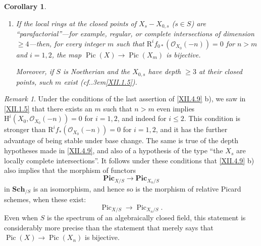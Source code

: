 \documentclass[11pt,a4paper,oneside]{book}
\providecommand{\sisi}[2]{#2}
\providecommand{\pageoriginale}{%
  \refstepcounter{pageoriginal}%
  \marginpar{\raggedright\footnotesize\bfseries\thepageoriginal}%
  \xspace}
\providecommand{\og}{``}
\providecommand{\fg}{''\xspace}
\providecommand{\cf}{cf.\kern.3em}
\providecommand{\Oo}{\mathcal O}
\providecommand{\catSch}{\mathbf{Sch}}
\providecommand{\SheafPic}{\mathbf{Pic}}
\providecommand{\Pic}{\operatorname{Pic}}
\renewcommand{\H}{\mathrm H}
\providecommand{\R}{\mathrm R}
\newenvironment{enumeratea}
  {\begin{enumerate}[label=\alph*)]}
  {\end{enumerate}}
\theoremstyle{plain}
\newtheorem{corollaire}[subsection]{Corollary}
\theoremstyle{definition}
\theoremstyle{remark}
\newtheorem{remarque}[subsection]{Remark}
\renewcommand{\Ref}[1]{\textup{\ref{#1}}}
\begin{document}
\begin{corollaire}
\begin{enumeratea}
\item
If the local rings at the closed points of $X_s-X_{0,s}$ ($s\in S$) are \og parafactorial\fg---for example, regular, or complete intersections of dimension $\geq 4$---then, for every integer $m$ such that $\R^if_{0\ast}(\Oo_{X_0}(-n))=0$ for $n>m$ and $i=1,2$, the map $\Pic(X)\to \Pic(X_m)$ is bijective.

Moreover, if $S$ is Noetherian and the $X_{0,s}$ have depth $\geq 3$ at their closed points, such $m$ exist (\cf \Ref{XII.1.5}).
\end{enumeratea}
\end{corollaire}

\begin{remarque} \label{XII.4.10}
Under\pageoriginale the conditions of the last assertion of \Ref{XII.4.9} b), we saw in \Ref{XII.1.5} that there exists an $m$ such that $n>m$ even implies $\H^i(X_0, \Oo_{X_0}(-n))=0$ for $i=1,2$, and indeed for $i\leq 2$\sisi{)}{}. This condition is stronger than $\R^if_{\ast}(\Oo_{X_0}(-n))=0$ for $i=1,2$, and it has the further advantage of being stable under base change. The same is true of the depth hypotheses made in \Ref{XII.4.9}, and also of a hypothesis of the type \og the $X_s$ are locally complete intersections\fg. It follows under these conditions that \Ref{XII.4.9} b) also implies that the morphism of functors
\[
\SheafPic_{X/S}\to \SheafPic_{X_n/S}
\]
in $\catSch_{/S}$ is an isomorphism, and hence so is the morphism of relative Picard schemes, when these exist:
\[
\Pic_{X/S}\to \Pic_{X_n/S}.
\]
Even when $S$ is the spectrum of an algebraically closed field, this statement is considerably more precise than the statement that merely says that $\Pic(X)\to \Pic(X_n)$ is bijective.


\end{remarque}
\end{document}
